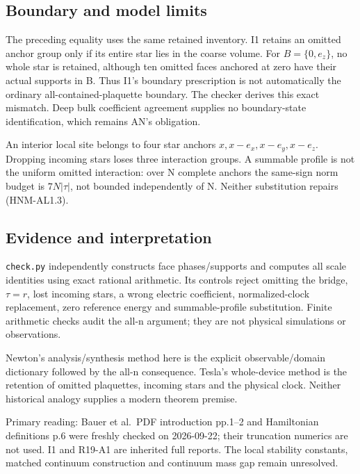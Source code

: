 \hypertarget{r29-al1-boundary-and-model-limits}{%
\subsection{Boundary and model limits}\label{r29:al1:r29-al1-boundary-and-model-limits}}

The preceding equality uses the same retained inventory. I1 retains an omitted anchor group only if its entire star lies in the coarse volume. For \(B=\{0,e_z\}\), no whole star is retained, although ten omitted faces anchored at zero have their actual supports in B. Thus I1's boundary prescription is not automatically the ordinary all-contained-plaquette boundary. The checker derives this exact mismatch. Deep bulk coefficient agreement supplies no boundary-state identification, which remains AN's obligation.

An interior local site belongs to four star anchors \(x,x-e_x,x-e_y,x-e_z\). Dropping incoming stars loses three interaction groups. A summable profile is not the uniform omitted interaction: over N complete anchors the same-sign norm budget is \(7N|\tau|\), not bounded independently of N. Neither substitution repairs (HNM-AL1.3).

\hypertarget{r29-al1-evidence-and-interpretation}{%
\subsection{Evidence and interpretation}\label{r29:al1:r29-al1-evidence-and-interpretation}}

\texttt{check.py} independently constructs face phases/supports and computes all scale identities using exact rational arithmetic. Its controls reject omitting the bridge, \(\tau=r\), lost incoming stars, a wrong electric coefficient, normalized-clock replacement, zero reference energy and summable-profile substitution. Finite arithmetic checks audit the all-n argument; they are not physical simulations or observations.

Newton's analysis/synthesis method here is the explicit observable/domain dictionary followed by the all-n consequence. Tesla's whole-device method is the retention of omitted plaquettes, incoming stars and the physical clock. Neither historical analogy supplies a modern theorem premise.

Primary reading: Bauer et al.~PDF introduction pp.1--2 and Hamiltonian definitions p.6 were freshly checked on 2026-09-22; their truncation numerics are not used. I1 and R19-A1 are inherited full reports. The local stability constants, matched continuum construction and continuum mass gap remain unresolved.

